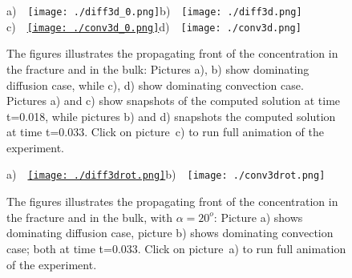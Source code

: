 \documentclass{article}
\begin{document}
\begin{figure}[h!]
\begin{center}
a)~~\texttt{[image: ./diff3d\_0.png]}\qquad b)~~\texttt{[image: ./diff3d.png]}\\
c)~~\href{www.math.uh.edu/~molshan/OLSH/pdf_refs/pdf_ref_video_outx4.html}{\texttt{[image: ./conv3d\_0.png]}}\qquad d)~~\texttt{[image: ./conv3d.png]}\\
\caption{\label{fig:prop}
The figures illustrates the propagating front of the concentration in the fracture and in the bulk: Pictures a), b) show dominating diffusion case, while  c), d) show dominating convection case. Pictures a) and c) {show} snapshots {of} the computed solution at time t=0.018, while pictures b) and d) snapshots the computed  solution at time t={0.033}. Click on picture~c) to run full animation of the experiment.}
\end{center}
\end{figure}

\begin{figure}[h!]
\begin{center}
a)~~\href{www.math.uh.edu/~molshan/OLSH/pdf_refs/pdf_ref_video_out_new_higher.html}{\texttt{[image: ./diff3drot.png]}}\qquad b)~~\texttt{[image: ./conv3drot.png]}
\caption{\label{fig:prop1}
The figures illustrates the propagating front of the concentration in the fracture and in the bulk, with $\alpha=20^o$: Picture a) shows dominating diffusion case, picture b) shows dominating convection case;  both at time t=0.033. Click on picture~a) to run full animation of the experiment.}
\end{center}
\end{figure}
\end{document}
